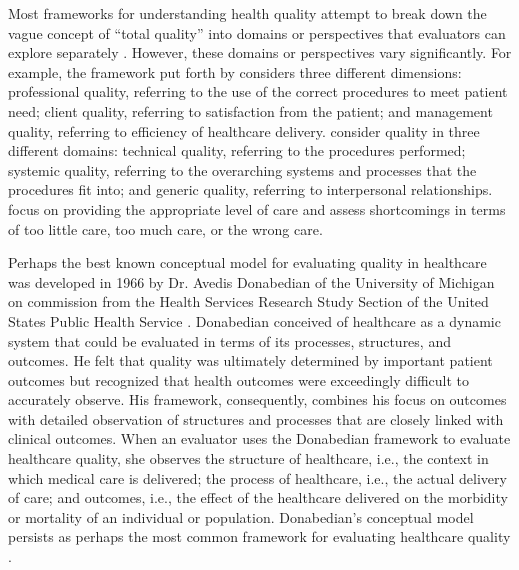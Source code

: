 \documentclass[12pt]{article}
\begin{document}
Most frameworks for understanding health quality attempt to break down the vague concept of ``total quality'' into domains or perspectives that evaluators can explore separately \citep{mosadeghradConceptualFrameworkQuality2012}. However, these domains or perspectives vary significantly. For example, the framework put forth by \citet{ovretveitHealthServiceQuality1992} considers three different dimensions: professional quality, referring to the use of the correct procedures to meet patient need; client quality, referring to satisfaction from the patient; and management quality, referring to efficiency of healthcare delivery. \citet{jossAdvancingQualityTotal1995} consider quality in three different domains: technical quality, referring to the procedures performed; systemic quality, referring to the overarching systems and processes that the procedures fit into; and generic quality, referring to interpersonal relationships. \citet{schusterHowGoodQuality1998} focus on providing the appropriate level of care and assess shortcomings in terms of too little care, too much care, or the wrong care.

Perhaps the best known conceptual model for evaluating quality in healthcare was developed in 1966 by Dr. Avedis Donabedian of the University of Michigan on commission from the Health Services Research Study Section of the United States Public Health Service \citep{donabedianEvaluatingQualityMedical1966}. Donabedian conceived of healthcare as a dynamic system that could be evaluated in terms of its processes, structures, and outcomes. He felt that quality was ultimately determined by important patient outcomes but recognized that health outcomes were exceedingly difficult to accurately observe. His framework, consequently, combines his focus on outcomes with detailed observation of structures and processes that are closely linked with clinical outcomes. When an evaluator uses the Donabedian framework to evaluate healthcare quality, she observes the structure of healthcare, i.e., the context in which medical care is delivered; the process of healthcare, i.e., the actual delivery of care; and outcomes, i.e., the effect of the healthcare delivered on the morbidity or mortality of an individual or population. Donabedian's conceptual model persists as perhaps the most common framework for evaluating healthcare quality \citep{berwickEvaluatingQualityMedical2016}.
\end{document}

